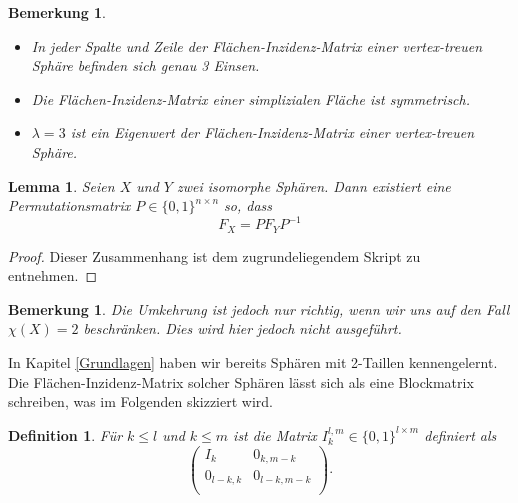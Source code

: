 \documentclass[12pt,titlepage,twoside,cleardoublepage]{article}
\theoremstyle{nummermitklammern}
\newtheorem{lemma}[temp]{Lemma}
\newtheorem{definition}[temp]{Definition}
\newtheorem{bemerkung}[temp]{Bemerkung}
\newtheorem{definition}[zahl]{Definition}
\newtheorem{lemma}[zahl]{Lemma}
\newtheorem{bemerkung}[zahl]{Bemerkung}
\numberwithin{equation}{section}
\begin{document}
\begin{bemerkung}
\begin{itemize}
\item In jeder Spalte und Zeile der Flächen-Inzidenz-Matrix einer vertex-treuen Sphäre befinden sich genau 3 Einsen. 
\item Die Flächen-Inzidenz-Matrix einer simplizialen Fläche  ist symmetrisch.
\item $\lambda =3$ ist ein Eigenwert der Flächen-Inzidenz-Matrix einer vertex-treuen Sphäre. 
\end{itemize}
\end{bemerkung}
\begin{lemma}
Seien $X$ und $Y$ zwei isomorphe Sphären. Dann existiert eine Permutationsmatrix $P\in \{0,1\}^{n \times n}$ so, dass 
\[
F_X=PF_YP^{-1}
\] 
\end{lemma}
\begin{proof}
Dieser Zusammenhang ist dem zugrundeliegendem Skript zu entnehmen.
\end{proof}

\begin{bemerkung}
Die Umkehrung ist jedoch nur richtig, wenn wir uns auf den Fall $\chi(X)=2$ beschränken.  Dies wird hier jedoch nicht ausgeführt. 
\end{bemerkung}
In Kapitel \ref{Grundlagen} haben wir bereits Sphären mit 2-Taillen kennengelernt. Die Flächen-Inzidenz-Matrix solcher Sphären lässt sich als eine Blockmatrix schreiben, was im Folgenden skizziert wird.
\begin{definition}
Für $k\leq l$ und $k\leq m$ ist die Matrix $I^{l,m}_k\in \{0,1\}^{l \times m}$ definiert als
\[
\left( 
\begin{array}{cccc} 
  I_k & 0_{k,m-k} \\
  0_{l-k,k} & 0_{l-k,m-k}\\
\end{array} 
\right).
\]
\end{definition}
\end{document}
